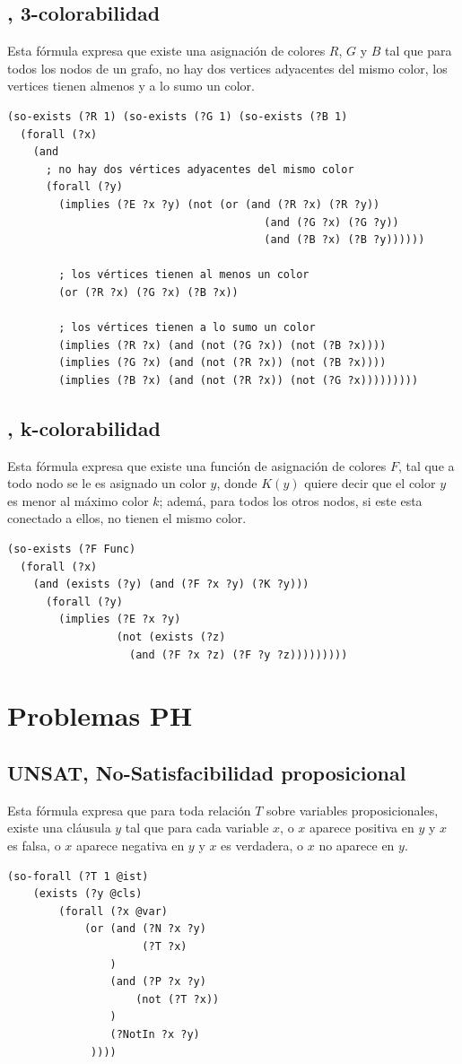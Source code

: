 \subsection{\TCOL, 3-colorabilidad}
Esta fórmula expresa que existe una asignación de colores $R$, $G$ y $B$ tal que para todos los nodos
de un grafo, no hay dos vertices adyacentes del mismo color, los vertices tienen
almenos y a lo sumo un color.
\begin{verbatim}
(so-exists (?R 1) (so-exists (?G 1) (so-exists (?B 1)
  (forall (?x) 
    (and
      ; no hay dos vértices adyacentes del mismo color
      (forall (?y)
        (implies (?E ?x ?y) (not (or (and (?R ?x) (?R ?y))
                                        (and (?G ?x) (?G ?y))
                                        (and (?B ?x) (?B ?y))))))

        ; los vértices tienen al menos un color
        (or (?R ?x) (?G ?x) (?B ?x))

        ; los vértices tienen a lo sumo un color
        (implies (?R ?x) (and (not (?G ?x)) (not (?B ?x))))
        (implies (?G ?x) (and (not (?R ?x)) (not (?B ?x))))
        (implies (?B ?x) (and (not (?R ?x)) (not (?G ?x)))))))))
\end{verbatim}

\subsection{\KCOL, k-colorabilidad}
Esta fórmula expresa que existe una función de asignación de colores $F$, tal que a todo nodo se le es
asignado un color $y$, donde $K(y)$ quiere decir que el color $y$ es menor al máximo color
$k$; ademá, para todos los otros nodos, si este esta conectado a ellos, no
tienen el mismo color.

\begin{verbatim}
(so-exists (?F Func)
  (forall (?x) 
    (and (exists (?y) (and (?F ?x ?y) (?K ?y)))
      (forall (?y) 
        (implies (?E ?x ?y)
                 (not (exists (?z)
                   (and (?F ?x ?z) (?F ?y ?z)))))))))
\end{verbatim}

\section{Problemas PH}

\subsection{UNSAT, No-Satisfacibilidad proposicional}
Esta fórmula expresa que para toda relación $T$ sobre variables
proposicionales, existe una cláusula $y$ tal que para cada variable $x$, o $x$
aparece positiva en $y$ y $x$ es falsa, o $x$ aparece negativa en $y$ y $x$ es
verdadera, o $x$ no aparece en $y$.
\begin{verbatim}
(so-forall (?T 1 @ist)
    (exists (?y @cls)
        (forall (?x @var)
            (or (and (?N ?x ?y)
                     (?T ?x)
                )
                (and (?P ?x ?y)
                    (not (?T ?x))
                )
                (?NotIn ?x ?y)
             ))))
\end{verbatim}


